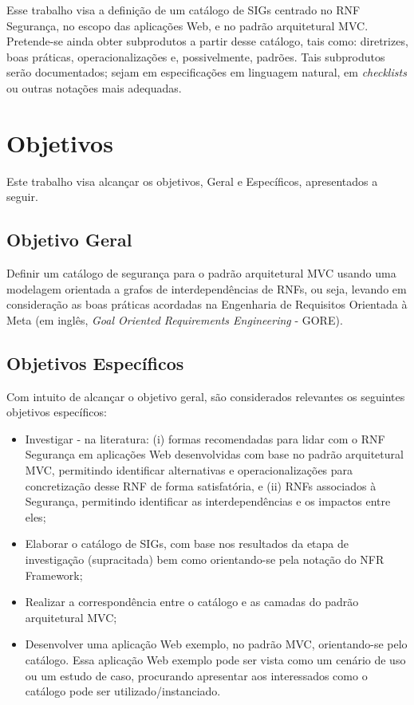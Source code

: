 Esse trabalho visa a definição de um catálogo de SIGs centrado no RNF Segurança, no escopo das aplicações Web, e no padrão arquitetural MVC. Pretende-se ainda obter subprodutos a partir desse catálogo, tais como: diretrizes, boas práticas, operacionalizações e, possivelmente, padrões. Tais subprodutos serão documentados; sejam em especificações em linguagem natural, em \textit{checklists}  ou outras notações mais adequadas.

\section{Objetivos}

Este trabalho visa alcançar os objetivos, Geral e Específicos, apresentados a seguir.  

\subsection{Objetivo Geral}

Definir um catálogo de segurança para o padrão arquitetural MVC usando uma modelagem orientada a grafos de interdependências de RNFs, ou seja, levando em consideração as boas práticas acordadas na Engenharia de Requisitos Orientada à Meta (em inglês, \textit{Goal Oriented Requirements Engineering} - GORE). 

\subsection{Objetivos Específicos}

Com intuito de alcançar o objetivo geral, são considerados relevantes os seguintes objetivos específicos:

\begin{itemize}
	
	\item Investigar - na literatura: (i) formas recomendadas para lidar com o RNF Segurança em aplicações Web desenvolvidas com base no padrão arquitetural MVC, permitindo identificar alternativas e operacionalizações para concretização desse RNF de forma satisfatória, e (ii) RNFs associados à Segurança, permitindo identificar as interdependências e os impactos entre eles;
	
	\item Elaborar o catálogo de SIGs, com base nos resultados da etapa de investigação (supracitada) bem como orientando-se pela notação do NFR Framework;
	
	\item Realizar a correspondência entre o  catálogo e as camadas do padrão arquitetural MVC;
	
	\item Desenvolver uma aplicação Web exemplo, no padrão MVC, orientando-se pelo catálogo. Essa aplicação Web exemplo pode ser vista como um cenário de uso ou um estudo de caso, procurando apresentar aos interessados como o catálogo pode ser utilizado/instanciado. 
	
\end{itemize}

